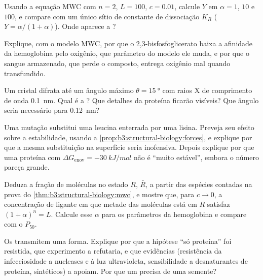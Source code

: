 \begin{exercise}[$\star\star$]\label{exo:b3:structural-biology:6}
Usando a equação MWC com $n = 2$, $L = 100$, $c = 0.01$, calcule $Y$ em
$\alpha = 1$, $10$ e $100$, e compare com um único sítio de constante
de dissociação $K_{R}$ ($Y = \alpha/(1+\alpha)$). Onde aparece a
?
\end{exercise}

\begin{exercise}[$\star\star$]\label{exo:b3:structural-biology:7}
Explique, com o modelo MWC, por que o 2,3-bisfosfoglicerato baixa a
afinidade da hemoglobina pelo oxigênio, que parâmetro do modelo ele
muda, e por que o sangue armazenado, que perde o composto, entrega
oxigênio mal quando transfundido.
\end{exercise}

\begin{exercise}[$\star\star$]\label{exo:b3:structural-biology:8}
Um cristal difrata até um ângulo máximo $\theta = \qty{15}{\degree}$
com raios X de comprimento de onda \qty{0.1}{nm}. Qual é a ?
Que detalhes da proteína ficarão visíveis? Que ângulo seria necessário
para \qty{0.12}{nm}?
\end{exercise}

\begin{exercise}[$\star\star$]\label{exo:b3:structural-biology:9}
Uma mutação substitui uma leucina enterrada por uma lisina. Preveja seu
efeito sobre a estabilidade, usando a
\cref{prop:b3:structural-biology:forces}, e explique por que a mesma
substituição na superfície seria inofensiva. Depois explique por que
uma proteína com $\Delta G_{\text{enov}} =
\qty{-30}{kJ/mol}$ não é
``muito estável'', embora o número pareça grande.
\end{exercise}

\begin{exercise}[$\star\star\star$]\label{exo:b3:structural-biology:10}
Deduza a fração de moléculas no estado $R$, $\bar R$, a partir das
espécies contadas na prova do \cref{thm:b3:structural-biology:mwc}, e
mostre que, para $c \to 0$, a concentração de ligante em que metade das
moléculas está em $R$ satisfaz $(1+\alpha)^{n} = L$. Calcule esse
$\alpha$ para os parâmetros da hemoglobina e compare com o $P_{50}$.
\end{exercise}

\begin{exercise}[$\star\star\star$]\label{exo:b3:structural-biology:11}
Os  transmitem uma forma. Explique por que a hipótese ``só
proteína'' foi resistida, que experimento a refutaria, e que evidências
(resistência da infecciosidade a nucleases e à luz ultravioleta,
sensibilidade a desnaturantes de proteína,  sintéticos) a apoiam.
Por que um  precisa de uma semente?
\end{exercise}

